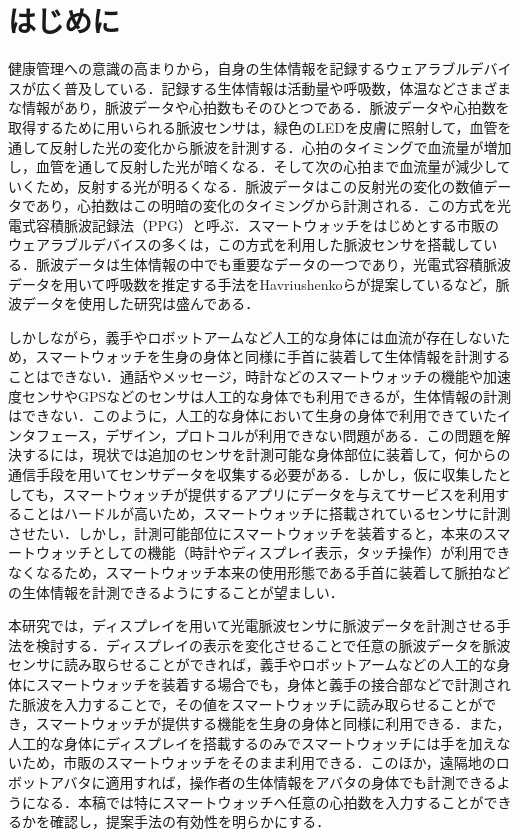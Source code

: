 \documentclass[Japanese,noauthor]{dicomopapers}
\begin{document}
\section{はじめに}
\label{introduction}
健康管理への意識の高まりから，自身の生体情報を記録するウェアラブルデバイスが広く普及している．記録する生体情報は活動量や呼吸数，体温などさまざまな情報があり，脈波データや心拍数もそのひとつである．脈波データや心拍数を取得するために用いられる脈波センサは，緑色のLEDを皮膚に照射して，血管を通して反射した光の変化から脈波を計測する．心拍のタイミングで血流量が増加し，血管を通して反射した光が暗くなる．そして次の心拍まで血流量が減少していくため，反射する光が明るくなる．脈波データはこの反射光の変化の数値データであり，心拍数はこの明暗の変化のタイミングから計測される．この方式を光電式容積脈波記録法（PPG）と呼ぶ．スマートウォッチをはじめとする市販のウェアラブルデバイスの多くは，この方式を利用した脈波センサを搭載している．脈波データは生体情報の中でも重要なデータの一つであり，光電式容積脈波データを用いて呼吸数を推定する手法をHavriushenkoら\cite{respiratory_rate_estimation}が提案しているなど，脈波データを使用した研究は盛んである．\par

しかしながら，義手やロボットアームなど人工的な身体には血流が存在しないため，スマートウォッチを生身の身体と同様に手首に装着して生体情報を計測することはできない．通話やメッセージ，時計などのスマートウォッチの機能や加速度センサやGPSなどのセンサは人工的な身体でも利用できるが，生体情報の計測はできない．このように，人工的な身体において生身の身体で利用できていたインタフェース，デザイン，プロトコルが利用できない問題がある．この問題を解決するには，現状では追加のセンサを計測可能な身体部位に装着して，何からの通信手段を用いてセンサデータを収集する必要がある．しかし，仮に収集したとしても，スマートウォッチが提供するアプリにデータを与えてサービスを利用することはハードルが高いため，スマートウォッチに搭載されているセンサに計測させたい．しかし，計測可能部位にスマートウォッチを装着すると，本来のスマートウォッチとしての機能（時計やディスプレイ表示，タッチ操作）が利用できなくなるため，スマートウォッチ本来の使用形態である手首に装着して脈拍などの生体情報を計測できるようにすることが望ましい．\par

本研究では，ディスプレイを用いて光電脈波センサに脈波データを計測させる手法を検討する．ディスプレイの表示を変化させることで任意の脈波データを脈波センサに読み取らせることができれば，義手やロボットアームなどの人工的な身体にスマートウォッチを装着する場合でも，身体と義手の接合部などで計測された脈波を入力することで，その値をスマートウォッチに読み取らせることができ，スマートウォッチが提供する機能を生身の身体と同様に利用できる．また，人工的な身体にディスプレイを搭載するのみでスマートウォッチには手を加えないため，市販のスマートウォッチをそのまま利用できる．このほか，遠隔地のロボットアバタに適用すれば，操作者の生体情報をアバタの身体でも計測できるようになる．本稿では特にスマートウォッチへ任意の心拍数を入力することができるかを確認し，提案手法の有効性を明らかにする．\par
\end{document}
